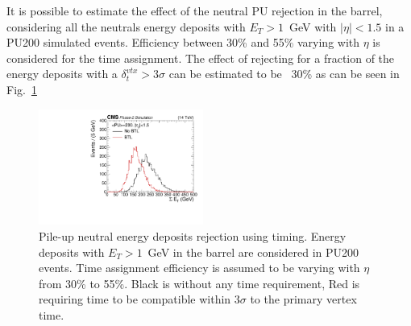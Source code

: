 It is possible to estimate the effect of the neutral PU rejection in the barrel, considering all the neutrals energy deposits  with $E_T>1$~GeV with $|\eta|<1.5$ in a PU200 simulated events. Efficiency between 30\% and 55\% varying with $\eta$ is considered for the time assignment. The effect of rejecting for a fraction of the energy deposits with a $\delta_{t}^{vtx}>3\sigma$ can be estimated to be ~30\% as can be seen in Fig.~\ref{fig:sumet_neu_comp} 

\begin{figure}[!hbtp]
\centering
\includegraphics[width=0.48\textwidth]{fig/performance/neutrals/sumet_comp.pdf}
\caption{Pile-up neutral energy deposits rejection using timing. Energy deposits with $E_T>1$~GeV in the barrel are considered in PU200 events. Time assignment efficiency is assumed to be varying with $\eta$ from 30\% to 55\%. Black is without any time requirement, Red is requiring time to be compatible within $3\sigma$ to the primary vertex time.}
\label{fig:sumet_neu_comp}
\end{figure}
